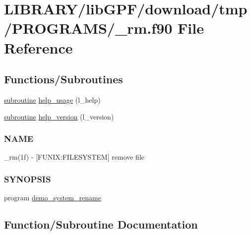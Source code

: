 \hypertarget{__rm_8f90}{}\section{L\+I\+B\+R\+A\+R\+Y/lib\+G\+P\+F/download/tmp/\+P\+R\+O\+G\+R\+A\+M\+S/\+\_\+rm.f90 File Reference}
\label{__rm_8f90}
\subsection*{Functions/\+Subroutines}
\begin{DoxyCompactItemize}
\item 
\hyperlink{M__stopwatch_83_8txt_acfbcff50169d691ff02d4a123ed70482}{subroutine} \hyperlink{__rm_8f90_a3e09a3b52ee8fb04eeb93fe5761626a8}{help\+\_\+usage} (l\+\_\+help)
\item 
\hyperlink{M__stopwatch_83_8txt_acfbcff50169d691ff02d4a123ed70482}{subroutine} \hyperlink{__rm_8f90_a39c21619b08a3c22f19e2306efd7f766}{help\+\_\+version} (l\+\_\+version)
\begin{DoxyCompactList}\small\item\em \subsubsection*{N\+A\+ME}

\+\_\+rm(1f) -\/ \mbox{[}F\+U\+N\+IX\+:F\+I\+L\+E\+S\+Y\+S\+T\+EM\mbox{]} remove file \subsubsection*{S\+Y\+N\+O\+P\+S\+IS}\end{DoxyCompactList}\item 
program \hyperlink{__rm_8f90_aad99fde3e962ae73c9d6bc3825b8ca79}{demo\+\_\+system\+\_\+rename}
\end{DoxyCompactItemize}


\subsection{Function/\+Subroutine Documentation}
\mbox{\label{__rm_8f90_aad99fde3e962ae73c9d6bc3825b8ca79}} 
